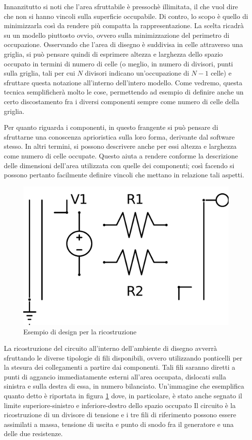 Innanzitutto si noti che l'area sfruttabile è pressochè illimitata, il che vuol dire che non si hanno vincoli sulla superficie occupabile. Di contro, lo scopo è quello di minimizzarla così da rendere più compatta la rappresentazione. La scelta ricadrà su un modello piuttosto ovvio, ovvero sulla minimizzazione del perimetro di occupazione. Osservando che l'area di disegno è suddivisa in celle attraverso una griglia, si può pensare quindi di esprimere altezza e larghezza dello spazio occupato in termini di numero di celle (o meglio, in numero di divisori, punti sulla griglia, tali per cui $ N $ divisori indicano un'occupazione di $ N-1 $ celle) e sfruttare questa notazione all'interno dell'intero modello. Come vedremo, questa tecnica semplificherà molto le cose, permettendo ad esempio di definire anche un certo discostamento fra i diversi componenti sempre come numero di celle della griglia.

Per quanto riguarda i componenti, in questo frangente si può pensare di sfruttarne una conoscenza aprioristica sulla loro forma, derivante dal software stesso. In altri termini, si possono descrivere anche per essi altezza e larghezza come numero di celle occupate. Questo aiuta a rendere conforme la descrizione delle dimensioni dell'area utilizzata con quelle dei componenti; così facendo si possono pertanto facilmente definire vincoli che mettano in relazione tali aspetti.

\begin{figure}[ht]
 \centering
 \includegraphics[scale=0.35]{immagini/design.pdf}
 \caption{Esempio di design per la ricostruzione}
 \label{cdes}
\end{figure}

La ricostruzione del circuito all'interno dell'ambiente di disegno avverrà sfruttando le diverse tipologie di fili disponibili, ovvero utilizzando ponticelli per la stesura dei collegamenti a partire dai componenti. Tali fili saranno diretti a punti di aggancio immediatamente esterni all'area occupata, dislocati sulla sinistra e sulla destra di essa, in numero bilanciato. Un'immagine che esemplifica quanto detto è riportata in figura \ref{cdes} dove, in particolare, è stato anche segnato il limite superiore-sinistro e inferiore-destro dello spazio occupato Il circuito è la ricostruzione di un divisore di tensione e i tre fili di riferimento possono essere assimilati a massa, tensione di uscita e punto di snodo fra il generatore e una delle due resistenze.

